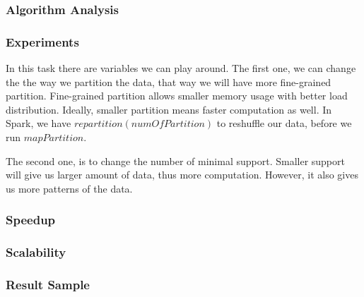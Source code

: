 \documentclass[11pt]{article}
\begin{document}
\subsubsection {Algorithm Analysis}
\subsubsection {Experiments}
In this task there are variables we can play around.
The first one, we can change the the way we partition the data, that way we will have more fine-grained partition.
Fine-grained partition allows smaller memory usage with better load distribution.
Ideally, smaller partition means faster computation as well.
In Spark, we have $repartition(numOfPartition)$ to reshuffle our data, before we run $mapPartition$.

The second one, is to change the number of minimal support.
Smaller support will give us larger amount of data, thus more computation.
However, it also gives us more patterns of the data.
\subsubsection {Speedup}
\subsubsection {Scalability}
\subsubsection {Result Sample}
 
\end{document}

